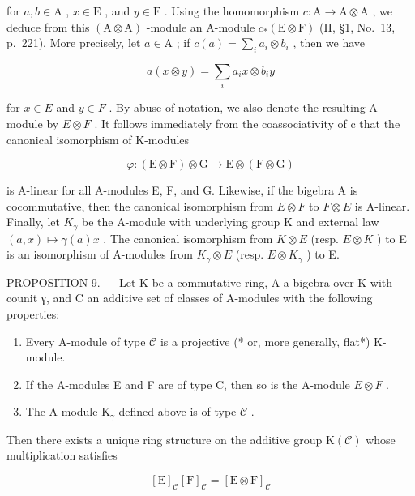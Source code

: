 for \(a, b \in \mathrm{A}\) , \(x \in \mathrm{E}\) , and \(y \in \mathrm{F}\) . Using the homomorphism \(c: \mathrm{A} \to \mathrm{A} \otimes \mathrm{A}\) , we deduce from this \((\mathrm{A} \otimes \mathrm{A})\) -module an A-module \(c_*(\mathrm{E} \otimes \mathrm{F})\) (II, §1, No.~13, p.~221). More precisely, let \(a \in \mathrm{A}\) ; if \(c(a) = \sum_{i} a_{i} \otimes b_{i}\) , then we have

\[
a (x \otimes y) = \sum_ {i} a _ {i} x \otimes b _ {i} y\tag{12}
\]

for \(x \in E\) and \(y \in F\) . By abuse of notation, we also denote the resulting A-module by \(E \otimes F\) . It follows immediately from the coassociativity of c that the canonical isomorphism of K-modules

\[
\varphi : (\mathrm{E} \otimes \mathrm{F}) \otimes \mathrm{G} \longrightarrow \mathrm{E} \otimes (\mathrm{F} \otimes \mathrm{G})
\]

is A-linear for all A-modules E, F, and G. Likewise, if the bigebra A is cocommutative, then the canonical isomorphism from \(E \otimes F\) to \(F \otimes E\) is A-linear. Finally, let \(K_{\gamma}\) be the A-module with underlying group K and external law \((a, x) \mapsto \gamma(a)x\) . The canonical isomorphism from \(K \otimes E\) (resp. \(E \otimes K\) ) to E is an isomorphism of A-modules from \(K_{\gamma} \otimes E\) (resp. \(E \otimes K_{\gamma}\) ) to E.

PROPOSITION 9. --- Let K be a commutative ring, A a bigebra over K with counit γ, and C an additive set of classes of A-modules with the following properties:

\begin{enumerate}
\def\labelenumi{(\roman{enumi})}
\item
  Every A-module of type \(\mathcal{C}\) is a projective (* or, more generally, flat*) K-module.
\item
  If the A-modules E and F are of type C, then so is the A-module \(E \otimes F\) .
\item
  The A-module \(\mathrm{K}_{\gamma}\) defined above is of type \(\mathcal{C}\) .
\end{enumerate}

Then there exists a unique ring structure on the additive group \(\mathrm{K}(\mathcal{C})\) whose multiplication satisfies

\[
[ \mathrm{E} ] _ {\mathcal {C}} [ \mathrm{F} ] _ {\mathcal {C}} = [ \mathrm{E} \otimes \mathrm{F} ] _ {\mathcal {C}}
\]

